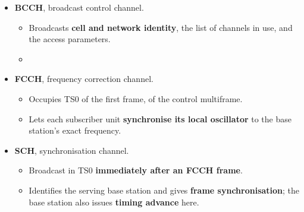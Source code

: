 {
\begin{itemize}
  \item \textbf{BCCH}, broadcast control channel.
  \begin{itemize}
    \item Broadcasts \textbf{cell and network identity}, the list of channels in use, and the
          access parameters.
    \item {}
  \end{itemize}
  \item \textbf{FCCH}, frequency correction channel.
  \begin{itemize}
    \item Occupies TS0 of the first frame,  of the control
          multiframe.
    \item Lets each subscriber unit \textbf{synchronise its local oscillator} to the base
          station's exact frequency.
  \end{itemize}
  \item \textbf{SCH}, synchronisation channel.
  \begin{itemize}
    \item Broadcast in TS0 \textbf{immediately after an FCCH frame}.
    \item Identifies the serving base station and gives \textbf{frame synchronisation}; the
          base station also issues \textbf{timing advance} here.
  \end{itemize}
\end{itemize}}


